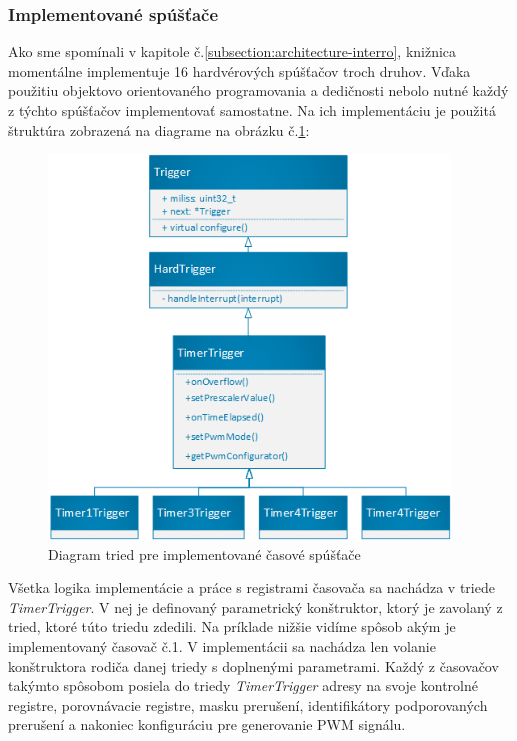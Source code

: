 \subsubsection{Implementované spúšťače}
\noindent \par
Ako sme spomínali v kapitole č.\ref{subsection:architecture-interro}, knižnica momentálne implementuje 16 hardvérových spúšťačov troch druhov. Vďaka použitiu
objektovo orientovaného programovania a dedičnosti nebolo nutné každý z týchto spúšťačov implementovať samostatne.
Na ich implementáciu je použitá štruktúra zobrazená na diagrame na obrázku č.\ref{figure:timer-class-diagram}:
\begin{figure}[!h]
    \centering
    \includegraphics[width=0.95\textwidth]{img/timer-class-diagram.png}
    \caption{Diagram tried pre implementované časové spúšťače}
    \label{figure:timer-class-diagram}
\end{figure}

Všetka logika implementácie a práce s registrami časovača sa nachádza v triede \textit{TimerTrigger}. V nej je definovaný parametrický konštruktor, ktorý
je zavolaný z tried, ktoré túto triedu zdedili. Na príklade nižšie vidíme spôsob akým je implementovaný časovač č.1. V implementácii sa nachádza len volanie
konštruktora rodiča danej triedy s doplnenými parametrami. Každý z časovačov takýmto spôsobom posiela do triedy \textit{TimerTrigger} adresy na svoje
kontrolné registre, porovnávacie registre, masku prerušení, identifikátory podporovaných prerušení a nakoniec konfiguráciu pre generovanie PWM signálu.

